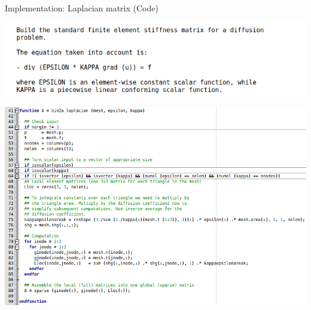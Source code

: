 \documentclass[aspectratio=54,xcolor=dvipsnames]{beamer}
\begin{document}
\begin{frame}{Implementation: Laplacian matrix (Code)}
    \begin{center}
        \begin{minipage}{0.55\textwidth}
            \centering
            \includegraphics[width=\textwidth]{Images/bim_lap_help.png}
        \end{minipage}\hfill
        \begin{minipage}{0.88\textwidth}
            \centering
            \includegraphics[width=\textwidth]{Images/bim_laplacian.png}
        \end{minipage}
    \end{center}
\end{frame}
\end{document}
